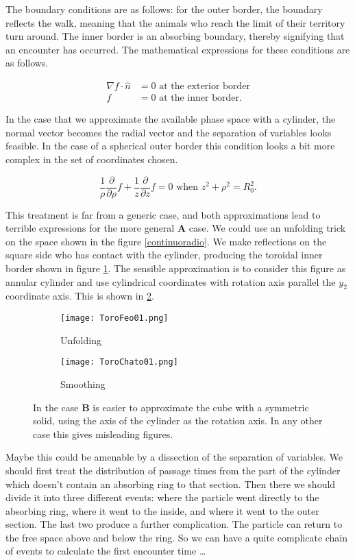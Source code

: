 \documentclass[letterpaperr,12pt]{article}
\newcommand{\Acase}{\textbf{A}\xspace}
\newcommand{\Bcase}{\textbf{B}\xspace}
\begin{document}
The boundary conditions are as follows: for the outer border, the boundary reflects the
walk, meaning that the animals who reach the limit of their territory turn around.
The inner border is an absorbing boundary, thereby signifying that an encounter
has occurred. The mathematical expressions for these conditions are as follows.

\begin{align}
\nabla f \cdot \hat{n} &=0 \text{ at the exterior border} \\
f &=0 \text{ at the inner border}.
\end{align}

In the case that we approximate the available phase space with a cylinder, 
the normal vector becomes the radial vector and the separation of variables
looks feasible. In the case of a spherical outer border this
condition looks a bit more complex in the set of coordinates chosen.

\begin{equation}
\frac{1}{\rho}\frac{\partial}{\partial\rho} f +
\frac{1}{z}\frac{\partial}{\partial z} f =0 \text{ when } z^2+\rho^2 = R_0 ^2.
\end{equation}

This treatment is far from a generic case, and both approximations lead 
to terrible expressions for the more general \Acase case. We could use an unfolding trick on
the space shown in the figure \ref{continuoradio}. We make reflections on the 
square side who has  contact with the cylinder, producing the toroidal inner border
shown in figure \ref{Unfold}. The sensible approximation is to consider this
figure as annular cylinder and use cylindrical coordinates with rotation axis parallel
the $y_2$ coordinate axis. This is shown in \ref{ToroChato}.


\begin{figure}[h]
  \centering
  \begin{subfigure}[b]{0.29\textwidth}
    \texttt{[image: ToroFeo01.png]}
    \caption{Unfolding}
    \label{Unfold}
  \end{subfigure}
  \begin{subfigure}[b]{0.29\textwidth}
    \texttt{[image: ToroChato01.png]}
    \caption{Smoothing}
    \label{ToroChato}
  \end{subfigure}
    \caption{In the case \Bcase is easier to approximate the 
    cube with a symmetric solid, using the axis of the cylinder
    as the rotation axis. In any other case this gives misleading figures.}
    \label{UnfoldandSmooth}
\end{figure}

Maybe this could be amenable by a dissection of the separation of variables.
We should first treat the distribution of passage times from the part of the
cylinder which doesn't contain an absorbing ring to that section. Then there we should
divide it into three different events: 
where the particle went directly to the absorbing ring, where it went to the
inside, and where it went to the outer section. The last two produce a further complication.
The particle can return to the free space above and below the ring. So we can have a 
quite complicate chain of events to calculate the first encounter time \ldots
\end{document}

